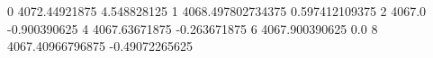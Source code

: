 0 4072.44921875 4.548828125
1 4068.497802734375 0.597412109375
2 4067.0 -0.900390625
4 4067.63671875 -0.263671875
6 4067.900390625 0.0
8 4067.40966796875 -0.49072265625
